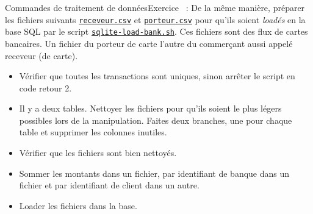 \documentclass{beamer}
\begin{document}
    \begin{frame}{Commandes de traitement de données}{Exercice \execcounterdispinc{}~:}
        De la même manière, préparer les fichiers suivants \href{https://github.com/My-Digital-School-by-PapIT/Linux/blob/main/receveur.csv}{\lstinline{receveur.csv}} et \href{https://github.com/My-Digital-School-by-PapIT/Linux/blob/main/porteur.csv}{\lstinline{porteur.csv}} pour qu'ils soient \textit{loadés} en la base SQL par le script \href{https://github.com/My-Digital-School-by-PapIT/Linux/blob/main/sqlite-load-bank.sh}{\lstinline{sqlite-load-bank.sh}}.
        \bigbreak
        Ces fichiers sont des flux de cartes bancaires.
        Un fichier du porteur de carte l'autre du commerçant aussi appelé receveur (de carte).
        \begin{itemize}
            \item Vérifier que toutes les transactions sont uniques, sinon arrêter le script en code retour 2.
            \item Il y a deux tables.
            Nettoyer les fichiers pour qu'ils soient le plus légers possibles lors de la manipulation.
            Faites deux branches, une pour chaque table et supprimer les colonnes inutiles.
            \item Vérifier que les fichiers sont bien nettoyés.
            \item Sommer les montants dans un fichier, par identifiant de banque dans un fichier et par identifiant de client dans un autre.
            \item Loader les fichiers dans la base.
        \end{itemize}
    \end{frame}
\end{document}

